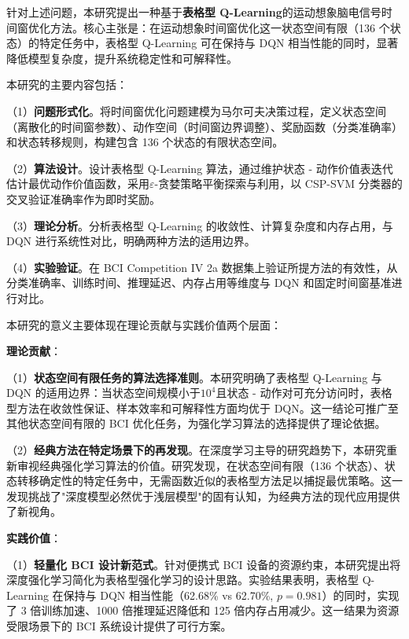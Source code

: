 \label{sec:research_content}

\label{subsec:research_content}

针对上述问题，本研究提出一种基于\textbf{表格型 Q-Learning}的运动想象脑电信号时间窗优化方法。核心主张是：在运动想象时间窗优化这一状态空间有限（136 个状态）的特定任务中，表格型 Q-Learning 可在保持与 DQN 相当性能的同时，显著降低模型复杂度，提升系统稳定性和可解释性。

本研究的主要内容包括：

（1）\textbf{问题形式化}。将时间窗优化问题建模为马尔可夫决策过程\cite{sutton2018reinforcement}，定义状态空间（离散化的时间窗参数）、动作空间（时间窗边界调整）、奖励函数（分类准确率）和状态转移规则，构建包含 136 个状态的有限状态空间。

（2）\textbf{算法设计}。设计表格型 Q-Learning 算法，通过维护状态 - 动作价值表迭代估计最优动作价值函数，采用$\varepsilon$-贪婪策略平衡探索与利用，以 CSP-SVM 分类器的交叉验证准确率作为即时奖励\cite{watkins1992q}。

（3）\textbf{理论分析}。分析表格型 Q-Learning 的收敛性、计算复杂度和内存占用，与 DQN 进行系统性对比，明确两种方法的适用边界。

（4）\textbf{实验验证}。在 BCI Competition IV 2a 数据集上验证所提方法的有效性，从分类准确率、训练时间、推理延迟、内存占用等维度与 DQN 和固定时间窗基准进行对比。

\label{subsec:contributions}

本研究的意义主要体现在理论贡献与实践价值两个层面：

\textbf{理论贡献}：

（1）\textbf{状态空间有限任务的算法选择准则}。本研究明确了表格型 Q-Learning 与 DQN 的适用边界：当状态空间规模小于$10^4$且状态 - 动作对可充分访问时，表格型方法在收敛性保证、样本效率和可解释性方面均优于 DQN。这一结论可推广至其他状态空间有限的 BCI 优化任务，为强化学习算法的选择提供了理论依据。

（2）\textbf{经典方法在特定场景下的再发现}。在深度学习主导的研究趋势下，本研究重新审视经典强化学习算法的价值。研究发现，在状态空间有限（136 个状态）、状态转移确定性的特定任务中，无需函数近似的表格型方法足以捕捉最优策略。这一发现挑战了"深度模型必然优于浅层模型"的固有认知，为经典方法的现代应用提供了新视角。

\textbf{实践价值}：

（1）\textbf{轻量化 BCI 设计新范式}。针对便携式 BCI 设备的资源约束，本研究提出将深度强化学习简化为表格型强化学习的设计思路。实验结果表明，表格型 Q-Learning 在保持与 DQN 相当性能（62.68\% vs 62.70\%, $p = 0.981$）的同时，实现了 3 倍训练加速、1000 倍推理延迟降低和 125 倍内存占用减少。这一结果为资源受限场景下的 BCI 系统设计提供了可行方案。

